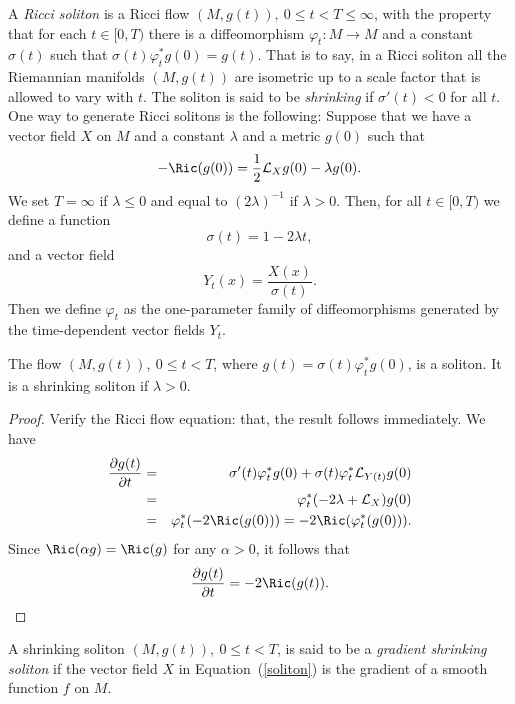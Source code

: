 A {\sl Ricci soliton}
is a Ricci flow $(M,g(t)),\ 0\le t<T\le \infty$, with the property that for
each $t\in [0,T)$ there is a diffeomorphism $\varphi_t\colon M\to M$ and a
constant $\sigma(t)$ such that $\sigma(t)\varphi_t^*g(0)=g(t)$. That is to say,
in a Ricci soliton all the Riemannian manifolds $(M,g(t))$ are isometric up to
a scale factor that is allowed to vary with $t$. The soliton is said to be {\em
shrinking} if $\sigma'(t)<0$ for all $t$. One way to generate Ricci solitons is
the following: Suppose that we have a vector field $X$ on $M$ and a constant
$\lambda$ and a metric $g(0)$ such that
\begin{equation}\label{soliton}
-\Ric(g(0))=\frac{1}{2}{\mathcal L}_Xg(0)-\lambda g(0).
\end{equation} We set $T=\infty$ if $\lambda\le 0$ and equal to $(2\lambda)^{-1}$
if $\lambda>0$. Then, for all $t\in [0,T)$ we define a function
$$\sigma(t)=1-2\lambda t,$$
and a vector field
$$Y_t(x)=\frac{X(x)}{\sigma(t)}.$$
 Then we define $\varphi_t$ as the one-parameter
family of diffeomorphisms generated by the time-dependent vector
fields $Y_t$.
\begin{claim}\label{claim:soliton-generation}
\label{solitonclaim}

 The flow
$(M,g(t)),\ 0\le t<T$, where $g(t)=\sigma(t)\varphi_t^*g(0)$, is a soliton. It
is a shrinking soliton if $\lambda>0$.
\end{claim}

\begin{proof}
\sketch Verify the Ricci flow equation:
that, the result follows immediately. We have
\begin{eqnarray*} \frac{\partial g(t)}{\partial t} & = &
\sigma'(t)\varphi_t^*g(0)+\sigma(t)\varphi_t^*{\mathcal L}_{Y(t)}g(0)\\
& = & \varphi_t^*(-2\lambda+{\mathcal L}_X)g(0)\\
& = & \varphi_t^*(-2\Ric(g(0))) =-2\Ric(\varphi_t^*(g(0))).
\end{eqnarray*}
Since $\Ric(\alpha g)=\Ric(g)$ for any $\alpha>0$, it follows that
$$\frac{\partial g(t)}{\partial t} = -2\Ric(g(t)).$$
\end{proof}



\begin{definition}\label{def:gradient-shrinking-soliton}
A shrinking soliton $(M,g(t)),\ 0\le t<T$, is said to be a {\em
gradient shrinking soliton} if
the vector field $X$ in Equation~(\ref{soliton}) is the gradient of
a smooth function $f$ on $M$.
\end{definition}


